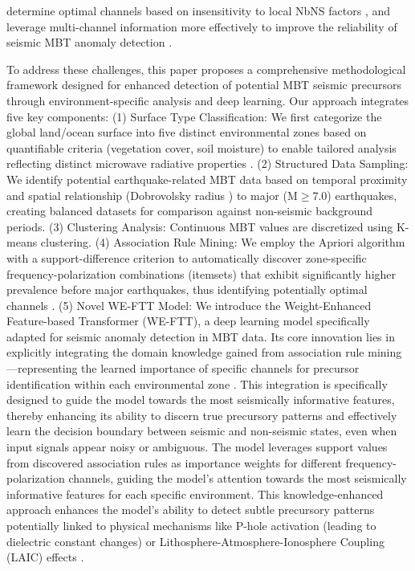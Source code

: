 \documentclass[fleqn,10pt]{wlscirep_mdpi_style}
\begin{document}
determine optimal channels based on insensitivity to local NbNS factors \cite{qiCharacteristicBackgroundMicrowave2023}, and leverage multi-channel information more effectively to improve the reliability of seismic MBT anomaly detection \cite{wuGEOSSbasedThermalParameters2012,lixinProgressesPossibleFrontiers2022}.

To address these challenges, this paper proposes a comprehensive methodological framework designed for enhanced detection of potential MBT seismic precursors through environment-specific analysis and deep learning. Our approach integrates five key components: (1) Surface Type Classification: We first categorize the global land/ocean surface into five distinct environmental zones based on quantifiable criteria (vegetation cover, soil moisture) to enable tailored analysis reflecting distinct microwave radiative properties \cite{njokuRetrievalLandSurface1999,maedaDiscriminationLocalFaint2008,wuIdentifyingSeismicAnomalies2024,oweMethodologySurfaceSoil2001}. (2) Structured Data Sampling: We identify potential earthquake-related MBT data based on temporal proximity and spatial relationship (Dobrovolsky radius \cite{dobrovolskyEstimationSizeEarthquake1979}) to major (M$\ge$7.0) earthquakes, creating balanced datasets for comparison against non-seismic background periods. (3) Clustering Analysis: Continuous MBT values are discretized using K-means clustering. (4) Association Rule Mining: We employ the Apriori algorithm with a support-difference criterion to automatically discover zone-specific frequency-polarization combinations (itemsets) that exhibit significantly higher prevalence before major earthquakes, thus identifying potentially optimal channels \cite{qiCharacteristicBackgroundMicrowave2023}. (5) Novel WE-FTT Model: We introduce the Weight-Enhanced Feature-based Transformer (WE-FTT), a deep learning model specifically adapted for seismic anomaly detection in MBT data. Its core innovation lies in explicitly integrating the domain knowledge gained from association rule mining—representing the learned importance of specific channels for precursor identification within each environmental zone \cite{qiCharacteristicBackgroundMicrowave2023,wuIdentifyingSeismicAnomalies2024}. This integration is specifically designed to guide the model towards the most seismically informative features, thereby enhancing its ability to discern true precursory patterns and effectively learn the decision boundary between seismic and non-seismic states, even when input signals appear noisy or ambiguous. The model leverages support values from discovered association rules as importance weights for different frequency-polarization channels, guiding the model's attention towards the most seismically informative features for each specific environment. This knowledge-enhanced approach enhances the model's ability to detect subtle precursory patterns potentially linked to physical mechanisms like P-hole activation (leading to dielectric constant changes) \cite{maoImpactCompressiveStress2020,liuGeneralFeaturesMultiparameter2023,freundPreearthquakeSignalsUnderlying2011,maoAdditionalMicrowaveRadiation2020} or Lithosphere-Atmosphere-Ionosphere Coupling (LAIC) effects \cite{qiMicrowaveBrightnessTemperature2022,lixinProgressesPossibleFrontiers2022,hayakawaIntegratedAnalysisMultiParameter2024}. 
\end{document}
